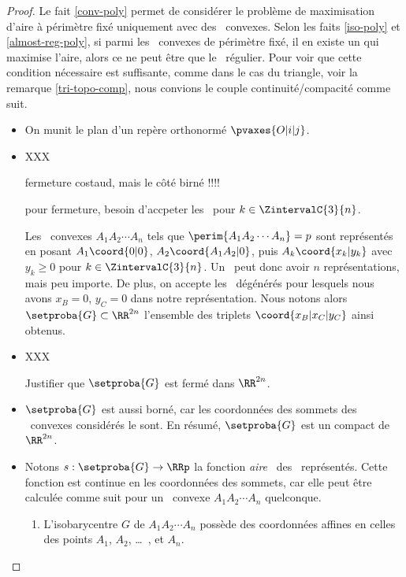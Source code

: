 \begin{proof}
	Le fait \ref{conv-poly} permet de considérer le problème de maximisation d'aire à périmètre fixé uniquement avec des \ngones\ convexes.
	Selon les faits \ref{iso-poly} et \ref{almost-reg-poly}, si parmi les \ngones\ convexes de périmètre fixé, il en existe un qui maximise l'aire, alors ce ne peut être que le \ngone\ régulier.
	Pour voir que cette condition nécessaire est suffisante, comme dans le cas du triangle, voir la remarque \ref{tri-topo-comp}, nous convions le couple continuité/compacité comme suit.
	\begin{itemize}
		\item On munit le plan d'un repère orthonormé $\pvaxes{O | i | j}$. 

		\item 
		XXX
		
		fermeture costaud, mais le côté birné !!!!
		
		pour fermeture, besoin d'accpeter les \kgones\ pour $k \in \ZintervalC{3}{n}$.
		
		Les \ngones\ convexes $A_1 A_2 \cdots A_n$ tels que $\perim{A_1 A_2 \cdots A_n} = p$ sont représentés en posant $A_1\coord{0 | 0}$, $A_2\coord{A_1 A_2 | 0}$, puis $A_k\coord{x_k | y_k}$ avec $y_k \geq 0$ pour $k \in \ZintervalC{3}{n}$. Un \ngone\ peut donc avoir $n$ représentations, mais peu importe.
		De plus, on accepte les \ngones\ dégénérés pour lesquels nous avons $x_B = 0$, $y_C = 0$ dans notre représentation.
		Nous notons alors $\setproba{G} \subset \RR^{2n}$ l'ensemble des triplets $\coord{x_B | x_C | y_C}$ ainsi obtenus.

		\item XXX
		
		Justifier que $\setproba{G}$ est fermé dans $\RR^{2n}$.

		\item $\setproba{G}$ est aussi borné, car les coordonnées des sommets des \ngones\ convexes considérés le sont.		
		En résumé, $\setproba{G}$ est un compact de $\RR^{2n}$.

		\item Notons $s: \setproba{G} \rightarrow \RRp$ la fonction \og \emph{aire} \fg\ des \ngones\ représentés. 
		Cette fonction est continue en les coordonnées des sommets, car elle peut être calculée comme suit pour un \ngone\ convexe $A_1 A_2 \cdots A_n$ quelconque.
		\begin{enumerate}
			\item L'isobarycentre $G$ de $A_1 A_2 \cdots A_n$ possède des coordonnées affines en celles des points $A_1$, $A_2$, \dots\ , et $A_n$.


\end{enumerate}
\end{itemize}
\end{proof}
